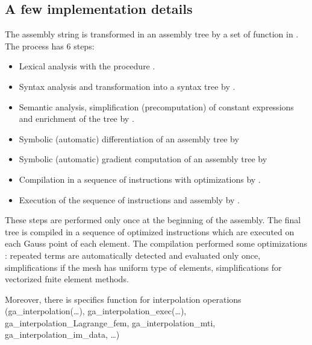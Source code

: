 \documentclass[a4paper,11pt,english]{sphinxmanual}
\begin{document}
\subsection{A few implementation details}
\label{\detokenize{project/libdesc_high_gen_assemb:a-few-implementation-details}}
The assembly string is transformed in an assembly tree by a set of function in . The process has 6 steps:
\begin{itemize}
\item {} 
Lexical analysis with the procedure .

\item {} 
Syntax analysis and transformation into a syntax tree by .

\item {} 
Semantic analysis, simplification (pre\sphinxhyphen{}computation) of constant expressions and enrichment of the tree by .

\item {} 
Symbolic (automatic) differentiation of an assembly tree by 

\item {} 
Symbolic (automatic) gradient computation of an assembly tree by 

\item {} 
Compilation in a sequence of instructions with optimizations by .

\item {} 
Execution of the sequence of instructions and assembly by .

\end{itemize}

These steps are performed only once at the beginning of the assembly. The final tree is compiled in a sequence of optimized instructions which are executed on each Gauss point of each element. The compilation performed some optimizations : repeated terms are automatically detected and evaluated only once, simplifications if the mesh has uniform type of elements, simplifications for vectorized fnite element methods.

Moreover, there is specifics function for interpolation operations (ga\_interpolation(…), ga\_interpolation\_exec(…), ga\_interpolation\_Lagrange\_fem, ga\_interpolation\_mti, ga\_interpolation\_im\_data, …)
\end{document}
